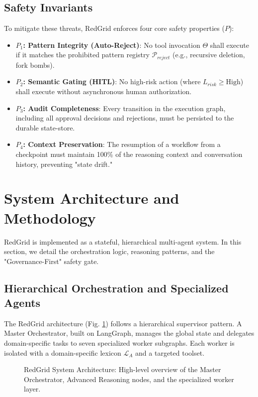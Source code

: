 \documentclass[conference]{IEEEtran}
\begin{document}
\subsection{Safety Invariants}
To mitigate these threats, RedGrid enforces four core safety properties ($P$):
\begin{itemize}
    \item \textbf{$P_1$: Pattern Integrity (Auto-Reject)}: No tool invocation $\Theta$ shall execute if it matches the prohibited pattern registry $\mathcal{P}_{reject}$ (e.g., recursive deletion, fork bombs).
    \item \textbf{$P_2$: Semantic Gating (HITL)}: No high-risk action (where $L_{risk} \geq \text{High}$) shall execute without asynchronous human authorization.
    \item \textbf{$P_3$: Audit Completeness}: Every transition in the execution graph, including all approval decisions and rejections, must be persisted to the durable state-store.
    \item \textbf{$P_4$: Context Preservation}: The resumption of a workflow from a checkpoint must maintain 100\% of the reasoning context and conversation history, preventing "state drift."
\end{itemize}

\section{System Architecture and Methodology}
\label{sec:methodology}

RedGrid is implemented as a stateful, hierarchical multi-agent system. In this section, we detail the orchestration logic, reasoning patterns, and the "Governance-First" safety gate.

\subsection{Hierarchical Orchestration and Specialized Agents}
The RedGrid architecture (Fig. \ref{fig:architecture}) follows a hierarchical supervisor pattern. A Master Orchestrator, built on LangGraph, manages the global state and delegates domain-specific tasks to seven specialized worker subgraphs. Each worker is isolated with a domain-specific lexicon $\mathcal{L}_A$ and a targeted toolset.

\begin{figure}[t]
\centering

\caption{RedGrid System Architecture: High-level overview of the Master Orchestrator, Advanced Reasoning nodes, and the specialized worker layer.}
\label{fig:architecture}
\end{figure}
\end{document}
